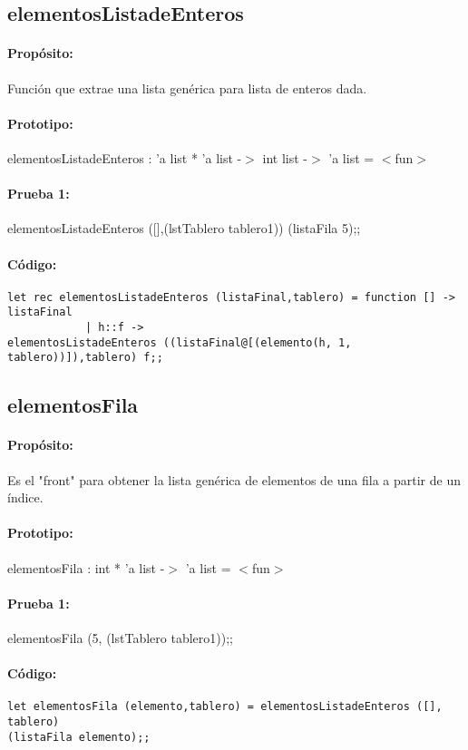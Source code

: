 \subsection{elementosListadeEnteros}

\paragraph{Propósito:} Función que extrae una lista genérica para lista de enteros dada.
\paragraph{Prototipo:} elementosListadeEnteros : 'a list * 'a list -$>$ int list -$>$ 'a list =
$<$fun$>$
\paragraph{Prueba 1:} elementosListadeEnteros ([],(lstTablero tablero1)) (listaFila 5);;
\paragraph{Código:}
\begin{verbatim}
let rec elementosListadeEnteros (listaFinal,tablero) = function [] -> listaFinal
			| h::f ->
elementosListadeEnteros ((listaFinal@[(elemento(h, 1, tablero))]),tablero) f;;
\end{verbatim}

\subsection{elementosFila}

\paragraph{Propósito:} Es el "front" para obtener la lista genérica de elementos de una fila
a partir de un índice.
\paragraph{Prototipo:} elementosFila : int * 'a list -$>$ 'a list = $<$fun$>$ 
\paragraph{Prueba 1:}elementosFila (5, (lstTablero tablero1));;
\paragraph{Código:}
\begin{verbatim}
let elementosFila (elemento,tablero) = elementosListadeEnteros ([], tablero)
(listaFila elemento);;
\end{verbatim}

